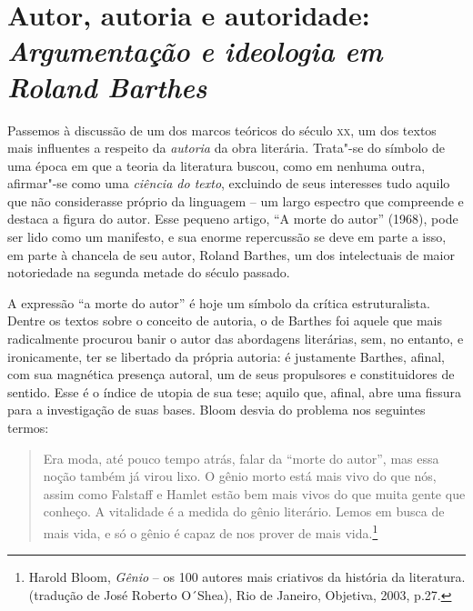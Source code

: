 \chapter*{Autor, autoria e autoridade:\\ \emph{Argumentação e ideologia em Roland Barthes}}




Passemos à discussão de um dos marcos teóricos do século \textsc{xx}, um
dos textos mais influentes a respeito da \emph{autoria} da obra
literária. Trata"-se do símbolo de uma época em que a teoria da
literatura buscou, como em nenhuma outra, afirmar"-se como uma
\emph{ciência do texto}, excluindo de seus interesses tudo aquilo que
não considerasse próprio da linguagem -- um largo espectro que
compreende e destaca a figura do autor. Esse pequeno artigo, ``A morte
do autor'' (1968), pode ser lido como um manifesto, e sua enorme
repercussão se deve em parte a isso, em parte à chancela de seu autor,
Roland Barthes, um dos intelectuais de maior notoriedade na segunda
metade do século passado.

A expressão ``a morte do autor'' é hoje um símbolo da crítica
estruturalista. Dentre os textos sobre o conceito de autoria, o de
Barthes foi aquele que mais radicalmente procurou banir o autor das
abordagens literárias, sem, no entanto, e ironicamente, ter se libertado
da própria autoria: é justamente Barthes, afinal, com sua magnética
presença autoral, um de seus propulsores e constituidores de sentido.
Esse é o índice de utopia de sua tese; aquilo que, afinal, abre uma
fissura para a investigação de suas bases. Bloom desvia do problema nos
seguintes termos:

\begin{quote}
Era moda, até pouco tempo atrás, falar da ``morte do autor'', mas essa
noção também já virou lixo. O gênio morto está mais vivo do que nós,
assim como Falstaff e Hamlet estão bem mais vivos do que muita gente que
conheço. A vitalidade é a medida do gênio literário. Lemos em busca de
mais vida, e só o gênio é capaz de nos prover de mais vida.\footnote{Harold
  Bloom, \emph{Gênio} -- os 100 autores mais criativos da história da
  literatura. (tradução de José Roberto O´Shea), Rio de Janeiro,
  Objetiva, 2003, p.27.}
\end{quote}

